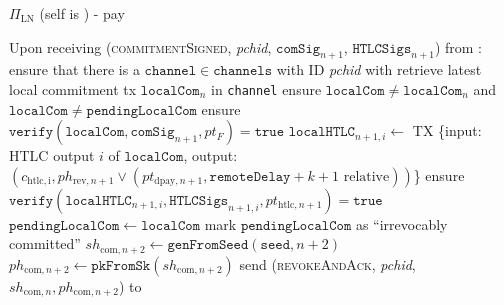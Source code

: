 \begin{protocolbox}{$\Pi_{\mathrm{LN}}$ (self is \alice) - pay}
\begin{algorithmic}[1]
    \State Upon receiving (\textsc{commitmentSigned}, \textit{pchid},
    $\mathtt{comSig}_{n+1}$, $\mathtt{HTLCSigs}_{n+1}$) from \bob:
    \Indent
      \State ensure that there is a $\mathtt{channel} \in \mathtt{channels}$
      with ID \textit{pchid} with \bob
      \State retrieve latest local commitment tx $\mathtt{localCom}_n$ in
      \texttt{channel}
      \State ensure $\mathtt{localCom} \neq \mathtt{localCom}_n$ and
      $\mathtt{localCom} \neq \mathtt{pendingLocalCom}$
      \State ensure $\mathtt{verify}\left(\mathtt{localCom},
      \mathtt{comSig}_{n+1}, pt_F\right) = \mathtt{true}$
        \State $\mathtt{localHTLC}_{n+1, i} \gets$ TX \{input: HTLC output $i$
        of $\mathtt{localCom}$, output: $\left(c_{\mathrm{htlc, i}},
        ph_{\mathrm{rev}, n+1} \vee \left(pt_{\mathrm{dpay}, n+1},
        \mathtt{remoteDelay} + k + 1 \text{ relative}\right)\right)$\}
        \State ensure $\mathtt{verify}\left(\mathtt{localHTLC}_{n+1, i},
        \mathtt{HTLCSigs}_{n+1, i}, pt_{\mathrm{htlc}, n+1}\right) =
        \mathtt{true}$
      \EndFor
      \State $\mathtt{pendingLocalCom} \gets \mathtt{localCom}$
      \State mark $\mathtt{pendingLocalCom}$ as ``irrevocably committed''
      \State $sh_{\mathrm{com}, n+2} \gets
      \texttt{genFromSeed}\left(\mathtt{seed}, n+2\right)$
      \State $ph_{\mathrm{com}, n+2} \gets
      \mathtt{pkFromSk}\left(sh_{\mathrm{com}, n+2}\right)$
      \State send (\textsc{revokeAndAck}, \textit{pchid}, $sh_{\mathrm{com}, n},
      ph_{\mathrm{com}, n+2}$) to \bob
    \EndIndent
    \State


\end{algorithmic}
\end{protocolbox}

